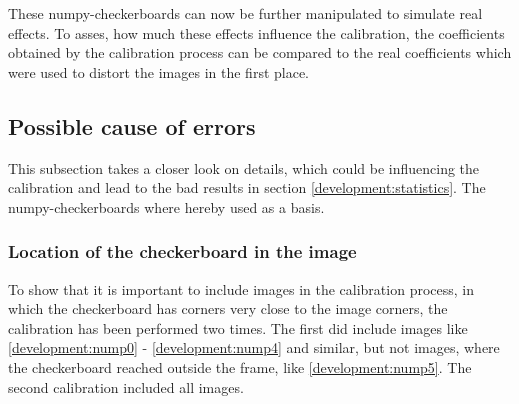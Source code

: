 These numpy-checkerboards can now be further manipulated to simulate real effects.
To asses, how much these effects influence the calibration, the coefficients obtained by the calibration process can be compared to the real coefficients which were used to distort the images in the first place.

\subsection{Possible cause of errors}
This subsection takes a closer look on details, which could be influencing the calibration and lead to the bad results in section \ref{development:statistics}.
The numpy-checkerboards where hereby used as a basis.

\subsubsection{Location of the checkerboard in the image}
To show that it is important to include images in the calibration process, in which the checkerboard has corners very close to the image corners, the calibration has been performed two times.
The first did include images like \ref{development:nump0} - \ref{development:nump4} and similar, but not images, where the checkerboard reached outside the frame, like \ref{development:nump5}.
The second calibration included all images.

